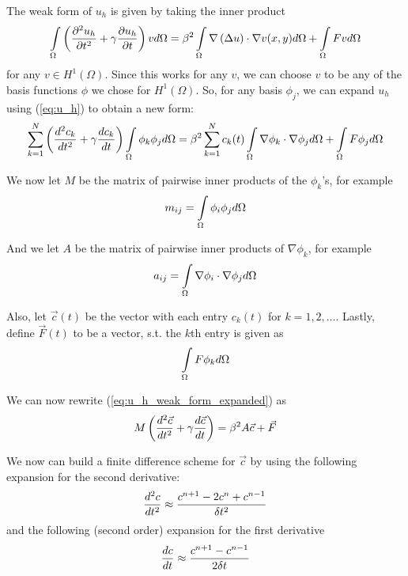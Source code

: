\documentclass[a4paper,12pt]{article}
\begin{document}
The weak form of $u_h$ is given by taking the inner product 
\begin{equation} \label{eq:u_h_weak_form}
\int\limits_{\Omega}  \left( \frac{\partial^2 u_h}{\partial t^2} + \gamma \frac{\partial u_h}{\partial t} \right)   v  d\Omega
=
\beta^2 \int\limits_{\Omega} \nabla  \left( \Delta u \right)  \cdot \nabla v(x,y) d\Omega
+ \int\limits_{\Omega} F v d\Omega
\end{equation}
for any $v \in H^1(\Omega)$. Since this works for any $v$, we can choose $v$ to be any of the basis functions $\phi$
we chose for $H^1(\Omega)$. So, for any basis $\phi_j$, we can expand $u_h$ using (\ref{eq:u_h}) to obtain a new form:
\begin{equation} \label{eq:u_h_weak_form_expanded}
\sum\limits_{k=1}^N \left( \frac{d^2 c_k}{d t^2} + \gamma\frac{d c_k}{d t} \right) \int\limits_{\Omega} \phi_k \phi_j d\Omega
=
\beta^2\sum\limits_{k=1}^N c_k(t) \int\limits_{\Omega} \nabla \phi_k \cdot \nabla \phi_j d\Omega
+
\int\limits_{\Omega} F \phi_j d\Omega
\end{equation}

We now let $M$ be the matrix of pairwise inner products of the $\phi_k$'s, for example
\begin{equation} \label{eq:m_definition}
m_{ij} = \int\limits_{\Omega} \phi_i \phi_j d\Omega
\end{equation}

And we let $A$ be the matrix of pairwise inner products of $\nabla \phi_k$, for example
\begin{equation} \label{eq:a_definition}
a_{ij} = \int\limits_{\Omega} \nabla \phi_i \cdot \nabla \phi_j d\Omega
\end{equation}

Also, let $\vec{c}(t)$ be the vector with each entry $c_k(t)$ for $k=1, 2, \ldots$. Lastly, define
$\vec{F}(t)$ to be a vector, s.t. the $k$th entry is given as 
\begin{equation} \label{eq:vec_F_definition}
\int\limits_{\Omega} F \phi_k d\Omega
\end{equation}

We can now rewrite (\ref{eq:u_h_weak_form_expanded}) as
\begin{equation} \label{eq:u_h_matrix}
M\left( \frac{d^2 \vec{c}}{d t^2} + \gamma\frac{d \vec{c}}{d t} \right) = \beta^2 A \vec{c} + \vec{F}
\end{equation}

We now can build a finite difference scheme for $\vec{c}$ by using the following expansion for the second derivative:
\begin{equation} \label{eq:second_derivative_finite_difference}
\frac{d^2 c}{d t^2} \approx \frac{c^{n+1} - 2c^n + c^{n-1}}{\delta t^2}
\end{equation}
and the following (second order) expansion for the first derivative
\begin{equation} \label{eq:first_derivative_finite_difference}
\frac{d c}{d t} \approx \frac{c^{n+1} - c^{n-1}}{2\delta t}
\end{equation}
\end{document}
